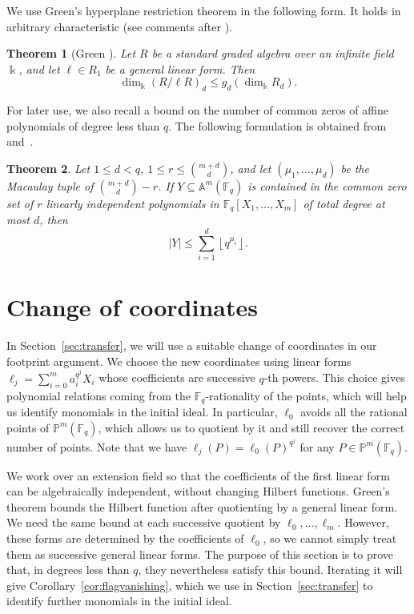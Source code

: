 \documentclass[11pt]{amsart}
\newtheorem{theorem}{Theorem}[section]
\theoremstyle{definition}
\newcommand{\F}{\mathbb F}
\newcommand{\PP}{\mathbb P}
\newcommand{\Aff}{\mathbb A}
\newcommand{\card}[1]{\left|#1\right|}
\newcommand{\sq}[1]{\left\lfloor q^{#1}\right\rfloor}
\numberwithin{equation}{section}
\begin{document}
We use Green's hyperplane restriction theorem in the following form.
It holds in arbitrary characteristic (see comments after \cite[Thm. 1.4]{Caviglia}). 

\begin{theorem}[Green {\cite{Green,Caviglia}}]\label{thm:green}
Let $R$ be a standard graded algebra over an infinite field $\Bbbk$,
and let $\ell\in R_1$ be a general linear form. Then
\[
 \dim_{\Bbbk}(R/\ell R)_d\le g_d(\dim_{\Bbbk} R_d).
\]
\end{theorem}

For later use, we also recall a bound on the number of common
zeros of affine polynomials of degree less than $q$.
The following formulation is obtained from~\cite[Thm. 5.10]{HP}
and~\cite[Thm. 2.1 and Lem. 2.5]{BDG22}.

\begin{theorem}\label{thm:affine}
Let $1\le d<q$, $1\le r\le\binom{m+d}{d}$, and let
$(\mu_1,\ldots,\mu_d)$ be the Macaulay tuple of
$\binom{m+d}{d}-r$.
If $Y\subseteq\Aff^m(\F_q)$ is contained in the common zero set
of $r$ linearly independent polynomials in $\F_q[X_1,\ldots,X_m]$
of total degree at most $d$, then
\[
 \card Y\le\sum_{i=1}^d\sq{\mu_i}.
\]
\end{theorem}

\section{Change of coordinates}\label{sec:restriction}
In Section~\ref{sec:transfer}, we will use a suitable change of
coordinates in our footprint argument. We choose the new
coordinates using linear forms $\ell_j=\sum_{i=0}^m a_i^{q^j}X_i$ whose coefficients are successive $q$-th powers. This choice gives polynomial relations coming
from the $\F_q$-rationality of the points, which will help us
identify monomials in the initial ideal. In particular, $\ell_0$ avoids all the rational points of $\PP^m(\F_q)$, which allows us to quotient by it and still recover the correct number of points. Note that we have $\ell_j(P)=\ell_0(P)^{q^j}$ for any $P\in \PP^m(\F_q)$.

We work over an extension field so that the coefficients
of the first linear form can be algebraically independent,
without changing Hilbert functions. Green's theorem bounds
the Hilbert function after quotienting by a general linear
form. We need the same bound at each successive quotient
by $\ell_0,\ldots,\ell_m$. However, these forms are determined
by the coefficients of $\ell_0$, so we cannot simply treat
them as successive general linear forms. The purpose of
this section is to prove that, in degrees less than $q$,
they nevertheless satisfy this bound. Iterating it will
give Corollary~\ref{cor:flagvanishing}, which we use in
Section~\ref{sec:transfer} to identify further monomials
in the initial ideal.
\end{document}
